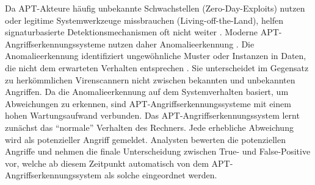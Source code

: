 %
%
\begin{sloppypar}
\noindent Da \acs{APT}-Akteure häufig unbekannte Schwachstellen (Zero-Day-Exploits) nutzen
oder legitime Systemwerkzeuge missbrauchen (Living-off-the-Land),
helfen signaturbasierte Detektionsmechanismen oft nicht weiter \cite[S.~6--7]{Buchta:2024}.
Moderne \acs{APT}-Angriffs\-erkennungs\-systeme nutzen daher Anomalieerkennung \cite[S.~8--9]{Buchta:2024}.
Die Anomalieerkennung identifiziert ungewöhnliche Muster
oder Instanzen in Daten,
die nicht dem erwarteten Verhalten entsprechen \cite[S.~8--9, 24]{Buchta:2024}.
Sie unterscheidet im Gegensatz zu herkömmlichen Virenscannern
nicht zwischen bekannten und unbekannten Angriffen.
Da die Anomalieerkennung auf dem Systemverhalten basiert,
um Abweichungen zu erkennen,
sind \acs{APT}-Angriffs\-erkennungs\-systeme
mit einem hohen Wartungsaufwand verbunden.
Das \acs{APT}-Angriffs\-erkennungs\-system lernt zunächst
das \enquote{normale} Verhalten des Rechners.
Jede erhebliche Abweichung wird als potenzieller Angriff gemeldet.
Analysten bewerten die potenziellen Angriffe
und nehmen die finale Unterscheidung zwischen True- und False-Positive vor,
welche ab diesem Zeitpunkt automatisch
von dem \acs{APT}-Angriffs\-erkennungs\-system als solche eingeordnet werden.
\end{sloppypar}

\vspace{7.56mm}

